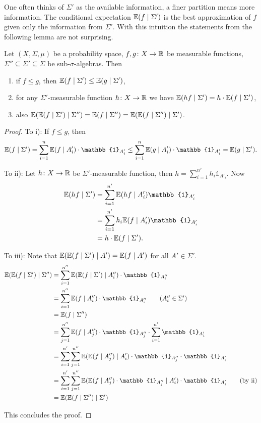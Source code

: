 One often thinks of $\Sigma'$ as the available information, a finer partition means more information. The conditional expectation $\mathbb{E}(f\mid \Sigma')$ is the best approximation of $f$ given only the information from $\Sigma'$. 
With this intuition the statements from the following lemma are not surprising. 
\begin{lemma}\label{lem:condExp}
Let $(X,\Sigma,\mu)$ be a probability space, $f,g\colon X\to \mathbb{R}$ be measurable functions, $\Sigma''\subseteq\Sigma'\subseteq\Sigma$ be sub-$\sigma$-algebras. Then
\begin{enumerate}[label=\roman*)]
\item if $f\leq g$, then $\mathbb{E}(f\mid \Sigma')\leq\mathbb{E}(g\mid \Sigma')$,
\item for any $\Sigma'$-measurable function $h\colon X\to\mathbb{R}$ we have $\mathbb{E}(h f\mid\Sigma')=h\cdot\mathbb{E}(f\mid\Sigma')$,
\item also $\mathbb{E}(\mathbb{E}(f\mid \Sigma')\mid\Sigma'')=\mathbb{E}(f\mid\Sigma'')=\mathbb{E}(\mathbb{E}(f\mid \Sigma'')\mid\Sigma')$.
\end{enumerate}
\end{lemma}
\begin{proof}
To i): If $f\leq g$, then
\[\E(f\mid \Sigma')=\sum_{i=1}^n\E(f\mid A'_i)\cdot \mathbb{1}_{A'_i}\leq \sum_{i=1}^n\E(g\mid A'_i)\cdot \mathbb{1}_{A'_i}=\E(g\mid \Sigma').\]


To ii): Let $h\colon X\to\mathbb{R}$ be $\Sigma'$-measurable function, then $h=\sum_{i=1}^{n'}h_i\mathbb{1}_{A'_i}$. Now 
\begin{align*}
\E(h f\mid\Sigma')&=\sum_{i=1}^{n'}\E(hf\mid A'_i)\mathbb{1}_{A'_i}\\
&=\sum_{i=1}^{n'}h_i\E(f\mid A'_i)\mathbb{1}_{A'_i}\\
&=h\cdot\E(f\mid\Sigma').
\end{align*}

To iii): Note that $\mathbb{E}(\mathbb{E}(f\mid \Sigma')\mid A')=\mathbb{E}(f\mid A')$ for all $A'\in\Sigma'$.
\begin{align*}
\E(\E(f\mid \Sigma')\mid\Sigma'')&=\sum_{i=1}^{n''}\E(\E(f\mid \Sigma')\mid A''_i)\cdot\mathbb{1}_{A''_i}\\
&=\sum_{i=1}^{n''}\E(f\mid A''_i)\cdot\mathbb{1}_{A''_i}\tag{$A''_i\in\Sigma'$}\\
&=\E(f\mid\Sigma'')\\
&=\sum_{j=1}^{n''}\E(f\mid A''_j)\cdot\mathbb{1}_{A''_j}\cdot\sum_{i=1}^{n'}\mathbb{1}_{A'_i}\\
&=\sum_{i=1}^{n'}\sum_{j=1}^{n''}\E(\E(f\mid A''_j)\mid A'_i)\cdot\mathbb{1}_{A''_j}\cdot\mathbb{1}_{A'_i}\\
&=\sum_{i=1}^{n'}\sum_{j=1}^{n''}\E(\E(f\mid A''_j)\cdot\mathbb{1}_{A''_j}\mid A'_i)\cdot\mathbb{1}_{A'_i}\tag{by ii}\\
&=\E(\E(f\mid \Sigma'')\mid\Sigma')
\end{align*}


This concludes the proof.
\end{proof}


